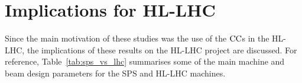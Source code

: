 






\section{Implications for HL-LHC}
Since the main motivation of these studies was the use of the ${\mathrm{CC}}$s in the HL-LHC, the implications of these results on the HL-LHC project are discussed. For reference, Table~\ref{tab:sps_vs_lhc} summarises some of the main machine and beam design parameters for the SPS and HL-LHC machines.

